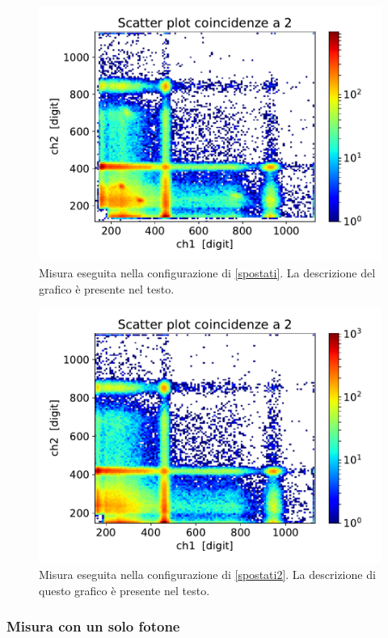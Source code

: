 \begin{figure}[h]
\centering
\includegraphics[width=\textwidth]{immagini/0518_rimbalzi}
\caption{Misura eseguita nella configurazione di \autoref{spostati}. La descrizione del grafico è presente nel testo.}
\label{spostato}
\end{figure}

\begin{figure}[h]
\centering
\includegraphics[width=\textwidth]{immagini/0518_piombo}
\caption{Misura eseguita nella configurazione di \autoref{spostati2}. La descrizione di questo grafico è presente nel testo.}
\label{piombo}
\end{figure}


\subsubsection{Misura con un solo fotone}


